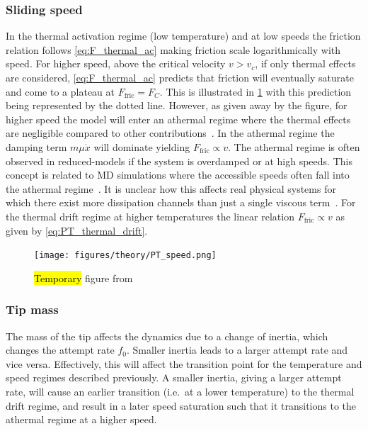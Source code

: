 

\subsubsection{Sliding speed}
In the thermal activation regime (low temperature) and at low speeds the friction relation follows \cref{eq:F_thermal_ac} making friction scale logarithmically with speed. For higher speed, above the critical velocity $v > v_c$, if only thermal effects are considered, \cref{eq:F_thermal_ac} predicts that friction will eventually saturate and come to a plateau at $F_{\text{fric}} = F_C$. This is illustrated in \cref{fig:PT_speed} with this prediction being represented by the dotted line. However, as given away by the figure, for higher speed the model will enter an athermal regime where the thermal effects are negligible compared to other contributions~\cite{PhysRevLett.89.224301}. In the athermal regime the damping term $m\mu \dot{x}$ will dominate yielding $F_{\text{fric}}
\propto v$. The athermal regime is often observed in reduced-models if the system is overdamped or at high speeds. This concept is related to \acrshort{MD} simulations where the accessible speeds often fall into the athermal regime~\cite{Li_2011}. It is unclear how this affects real physical systems for which there exist more dissipation channels than just a single viscous term~\cite{Dong_2013}. For the thermal drift regime at higher temperatures the linear relation $F_{\text{fric}} \propto v$ as given by \cref{eq:PT_thermal_drift}.

\begin{figure}[H]
  \centering
  \texttt{[image: figures/theory/PT\_speed.png]}
  \caption{\hl{Temporary} figure from~\cite{Yalin_2011}}
  \label{fig:PT_speed}
\end{figure}


\subsubsection{Tip mass}
The mass of the tip affects the dynamics due to a change of inertia, which changes the attempt rate $f_0$. Smaller inertia leads to a larger attempt rate and vice versa. Effectively, this will affect the transition point for the temperature and speed regimes described previously. A smaller inertia, giving a larger attempt rate, will cause an earlier transition (i.e.\ at a lower temperature) to the thermal drift regime, and result in a later speed saturation such that it transitions to the athermal regime at a higher speed. 


